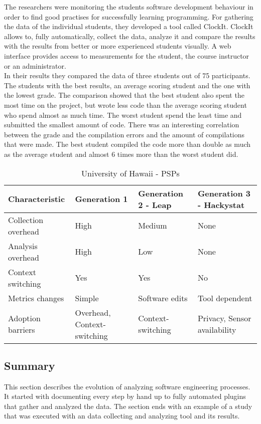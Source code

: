 The researchers were monitoring the students software development behaviour in order to find good practises for successfully learning programming. For gathering the data of the individual students, they developed a tool called ClockIt. ClockIt allows to, fully automatically, collect the data, analyze it and compare the results with the results from better or more experienced students visually. A web interface provides access to measurements for the student, the course instructor or an administrator.\\
In their results they compared the data of three students out of 75 participants. The students with the best results, an average scoring student and the one with the lowest grade. 
The comparison showed that the best student also spent the most time on the project, but wrote less code than the average scoring student who spend almost as much time. The worst student spend the least time and submitted the smallest amount of code. There was an interesting correlation between the grade and the compilation errors and the amount of compilations that were made. The best student compiled the code more than double as much as the average student and almost 6 times more than the worst student did. \cite{norris2008clockit}

\begin{table}[ht]
  \begin{tabular}{|P{5cm}|P{3cm}|P{3cm}|P{3cm}|}
  \hline
   \textbf{Characteristic}	& \textbf{Generation 1} & \textbf{Generation 2 - Leap} & \textbf{Generation 3 - Hackystat} \\ \hline
	Collection overhead	& High 											& Medium  				& None \\ \hline
	Analysis overhead	& High 											& Low 						& None \\ \hline
	Context switching	& Yes 											& Yes 						& No \\ \hline
	Metrics changes		& Simple 										& Software edits		& Tool dependent \\ \hline
	Adoption barriers		& Overhead, Context-switching 	& Context-switching	& Privacy, Sensor availability \\ \hline
  \end{tabular}
  \newline\newline
  \caption{University of Hawaii - PSPs}\label{psps}
\end{table}

\subsection{Summary}
This section describes the evolution of analyzing software engineering processes. It started with documenting every step by hand up to fully automated plugins that gather and analyzed the data.
The section ends with an example of a study that was executed with an data collecting and analyzing tool and its results. 


